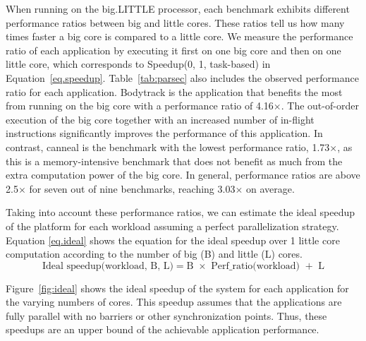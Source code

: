 When running on the big.LITTLE processor, each benchmark exhibits different performance ratios between big and little cores. These ratios tell us how many times faster a big core is compared to a little core. We measure the performance ratio of each application by executing it first on one big core and then on one little core, which corresponds to Speedup(0, 1, task-based) in Equation~\ref{eq.speedup}. 
Table~\ref{tab:parsec} also includes the observed performance ratio for each application. Bodytrack is the application that benefits the most from running on the big core with a performance ratio of 4.16$\times$. The out-of-order execution of the big core together with an increased number of in-flight instructions significantly improves the performance of this application. In contrast, canneal is the benchmark with the lowest performance ratio, 1.73$\times$, as this is a memory-intensive benchmark that does not benefit as much from the extra computation power of the big core. In general, performance ratios are above 2.5$\times$ for seven out of nine benchmarks, reaching 3.03$\times$ on average. 


Taking into account these performance ratios, we can estimate the ideal speedup of the platform for 
each workload assuming a perfect parallelization strategy. Equation \ref{eq.ideal} shows the 
equation for the ideal speedup over 1 little core computation according to the number of big (B) and 
little (L) cores.
\begingroup\makeatletter\def\f@size{8}\check@mathfonts
\begin{equation}
  \text{Ideal speedup(workload, B, L)} = \text{B $\times$ Perf\_ratio(workload) $+$ L}
\label{eq.ideal}
\end{equation}
\endgroup


Figure~\ref{fig:ideal} shows the ideal speedup of the system for each application for the varying 
numbers of cores. This speedup assumes that the applications are fully parallel with no barriers or 
other synchronization points. Thus, these speedups are an upper bound of the achievable application performance.
